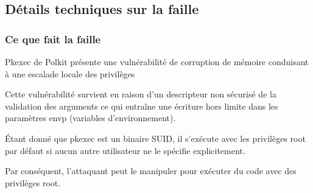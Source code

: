 \documentclass[12pt,a4paper]{article}
\begin{document}
   		\subsection{Détails techniques sur la faille}
   		\begin{flushleft}
            \subsubsection{Ce que fait la faille}
                \begin{flushleft}
                     \noindent Pkexec de Polkit présente une vulnérabilité de corruption de mémoire conduisant à une escalade locale des privilèges
                    \item Cette vulnérabilité survient en raison d’un descripteur non sécurisé de la validation des arguments ce qui entraîne une écriture hors limite dans les paramètres envp (variables d’environnement).
                    \item Étant donné que pkexec est un binaire SUID, il s’exécute avec les privilèges root par défaut si aucun autre utilisateur ne le spécifie explicitement. 
                    \item Par conséquent, l’attaquant peut le manipuler pour exécuter du code avec des privilèges root.
                \end{flushleft}

\end{flushleft}
\end{document}

